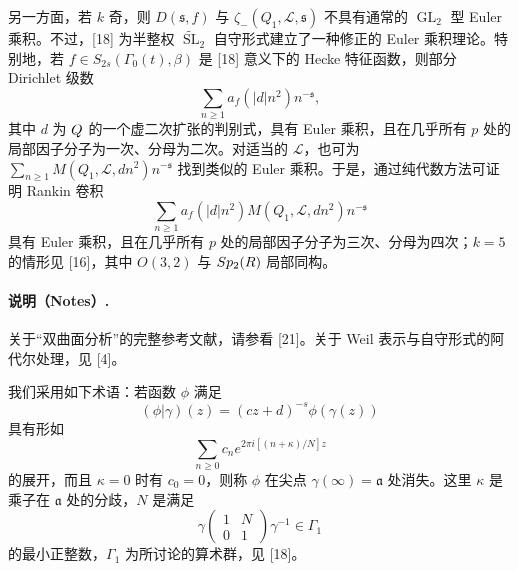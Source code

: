 另一方面，若 $k$ 奇，则 $D(\mathfrak s,f)$ 与 $\zeta_-(Q_1,\mathcal L,\mathfrak s)$ 不具有通常的 $\operatorname{GL}_2$ 型 Euler 乘积。不过，[18] 为半整权 $\widetilde{\operatorname{SL}}_2$ 自守形式建立了一种修正的 Euler 乘积理论。特别地，若 $f\in S_{2s}(\Gamma_0(t),\beta)$ 是 [18] 意义下的 Hecke 特征函数，则部分 Dirichlet 级数
\[
 \sum_{n\ge1}a_f(|d|n^2)n^{-\mathfrak s},
\]
其中 $d$ 为 $Q$ 的一个虚二次扩张的判别式，具有 Euler 乘积，且在几乎所有 $p$ 处的局部因子分子为一次、分母为二次。对适当的 $\mathcal L$，也可为
$\sum_{n\ge1}M(Q_1,\mathcal L,dn^2)n^{-\mathfrak s}$ 找到类似的 Euler 乘积。于是，通过纯代数方法可证明 Rankin 卷积
\[
 \sum_{n\ge1}a_f(|d|n^2)M(Q_1,\mathcal L,dn^2)n^{-\mathfrak s}
\]
具有 Euler 乘积，且在几乎所有 $p$ 处的局部因子分子为三次、分母为四次；$k=5$ 的情形见 [16]，其中 $O(3,2)$ 与 $Sp_2(R)$ 局部同构。

\paragraph*{说明（Notes）.}
关于“双曲面分析”的完整参考文献，请参看 [21]。关于 Weil 表示与自守形式的阿代尔处理，见 [4]。

我们采用如下术语：若函数 $\phi$ 满足
\[
 (\phi|\gamma)(z)=(cz+d)^{-s}\phi(\gamma(z))
\]
具有形如
\[
 \sum_{n\ge0}c_ne^{2\pi i[(n+\kappa)/N]z}
\]
的展开，而且 $\kappa=0$ 时有 $c_0=0$，则称 $\phi$ 在尖点 $\gamma(\infty)=\mathfrak a$ 处消失。这里 $\kappa$ 是乘子在 $\mathfrak a$ 处的分歧，$N$ 是满足
\[
 \gamma\begin{pmatrix}1&N\\0&1\end{pmatrix}\gamma^{-1}\in\Gamma_1
\]
的最小正整数，$\Gamma_1$ 为所讨论的算术群，见 [18]。

